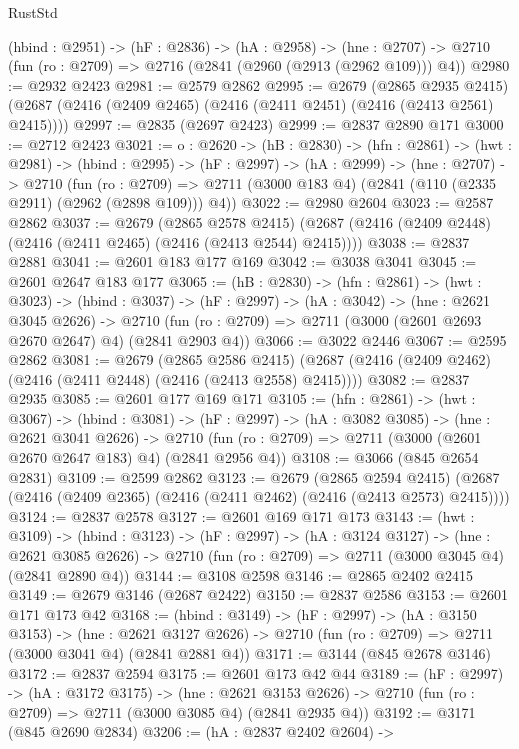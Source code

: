 \begin{lexlean}{RustStd}
\begin{coremodule}
  (hbind : @2951) ->
  (hF : @2836) ->
  (hA : @2958) ->
  (hne : @2707) -> @2710 (fun (ro : @2709) => @2716 (@2841 (@2960 (@2913 (@2962 @109))) @4))
@2980 := @2932 @2423
@2981 := @2579 @2862
@2995 := @2679
    (@2865 @2935 @2415)
    (@2687 (@2416 (@2409 @2465) (@2416 (@2411 @2451) (@2416 (@2413 @2561) @2415))))
@2997 := @2835 (@2697 @2423)
@2999 := @2837 @2890 @171
@3000 := @2712 @2423
@3021 := {o : @2620} ->
  (hB : @2830) ->
  (hfn : @2861) ->
  (hwt : @2981) ->
  (hbind : @2995) ->
  (hF : @2997) ->
  (hA : @2999) ->
  (hne : @2707) ->
  @2710
    (fun (ro : @2709) => @2711 (@3000 @183 @4) (@2841 (@110 (@2335 @2911) (@2962 (@2898 @109))) @4))
@3022 := @2980 @2604
@3023 := @2587 @2862
@3037 := @2679
    (@2865 @2578 @2415)
    (@2687 (@2416 (@2409 @2448) (@2416 (@2411 @2465) (@2416 (@2413 @2544) @2415))))
@3038 := @2837 @2881
@3041 := @2601 @183 @177 @169
@3042 := @3038 @3041
@3045 := @2601 @2647 @183 @177
@3065 := (hB : @2830) ->
  (hfn : @2861) ->
  (hwt : @3023) ->
  (hbind : @3037) ->
  (hF : @2997) ->
  (hA : @3042) ->
  (hne : @2621 @3045 @2626) ->
  @2710 (fun (ro : @2709) => @2711 (@3000 (@2601 @2693 @2670 @2647) @4) (@2841 @2903 @4))
@3066 := @3022 @2446
@3067 := @2595 @2862
@3081 := @2679
    (@2865 @2586 @2415)
    (@2687 (@2416 (@2409 @2462) (@2416 (@2411 @2448) (@2416 (@2413 @2558) @2415))))
@3082 := @2837 @2935
@3085 := @2601 @177 @169 @171
@3105 := (hfn : @2861) ->
  (hwt : @3067) ->
  (hbind : @3081) ->
  (hF : @2997) ->
  (hA : @3082 @3085) ->
  (hne : @2621 @3041 @2626) ->
  @2710 (fun (ro : @2709) => @2711 (@3000 (@2601 @2670 @2647 @183) @4) (@2841 @2956 @4))
@3108 := @3066 (@845 @2654 @2831)
@3109 := @2599 @2862
@3123 := @2679
    (@2865 @2594 @2415)
    (@2687 (@2416 (@2409 @2365) (@2416 (@2411 @2462) (@2416 (@2413 @2573) @2415))))
@3124 := @2837 @2578
@3127 := @2601 @169 @171 @173
@3143 := (hwt : @3109) ->
  (hbind : @3123) ->
  (hF : @2997) ->
  (hA : @3124 @3127) ->
  (hne : @2621 @3085 @2626) -> @2710 (fun (ro : @2709) => @2711 (@3000 @3045 @4) (@2841 @2890 @4))
@3144 := @3108 @2598
@3146 := @2865 @2402 @2415
@3149 := @2679 @3146 (@2687 @2422)
@3150 := @2837 @2586
@3153 := @2601 @171 @173 @42
@3168 := (hbind : @3149) ->
  (hF : @2997) ->
  (hA : @3150 @3153) ->
  (hne : @2621 @3127 @2626) -> @2710 (fun (ro : @2709) => @2711 (@3000 @3041 @4) (@2841 @2881 @4))
@3171 := @3144 (@845 @2678 @3146)
@3172 := @2837 @2594
@3175 := @2601 @173 @42 @44
@3189 := (hF : @2997) ->
  (hA : @3172 @3175) ->
  (hne : @2621 @3153 @2626) -> @2710 (fun (ro : @2709) => @2711 (@3000 @3085 @4) (@2841 @2935 @4))
@3192 := @3171 (@845 @2690 @2834)
@3206 := (hA : @2837 @2402 @2604) ->

\end{coremodule}
\end{lexlean}
